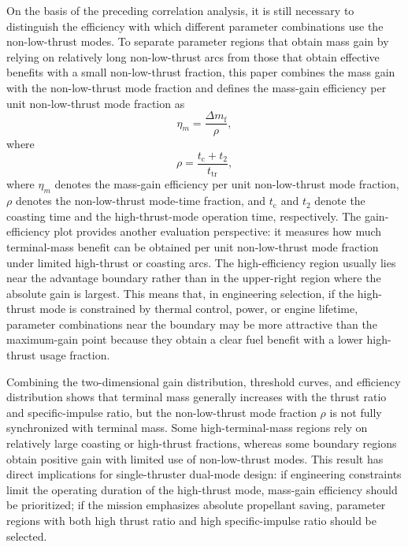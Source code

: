 ﻿\documentclass{IEEEtaes}
\begin{document}
On the basis of the preceding correlation analysis, it is still necessary to distinguish the efficiency with which different parameter combinations use the non-low-thrust modes. To separate parameter regions that obtain mass gain by relying on relatively long non-low-thrust arcs from those that obtain effective benefits with a small non-low-thrust fraction, this paper combines the mass gain with the non-low-thrust mode fraction and defines the mass-gain efficiency per unit non-low-thrust mode fraction as
\begin{equation}
\eta_m=\frac{\Delta m_{\mathrm{f}}}{\rho},
\end{equation}
where
\begin{equation}
\rho=\frac{t_{\mathrm{c}}+t_2}{t_{\mathrm{tr}}},
\end{equation}
where $\eta_m$ denotes the mass-gain efficiency per unit non-low-thrust mode fraction, $\rho$ denotes the non-low-thrust mode-time fraction, and $t_{\mathrm{c}}$ and $t_2$ denote the coasting time and the high-thrust-mode operation time, respectively. The gain-efficiency plot provides another evaluation perspective: it measures how much terminal-mass benefit can be obtained per unit non-low-thrust mode fraction under limited high-thrust or coasting arcs. The high-efficiency region usually lies near the advantage boundary rather than in the upper-right region where the absolute gain is largest. This means that, in engineering selection, if the high-thrust mode is constrained by thermal control, power, or engine lifetime, parameter combinations near the boundary may be more attractive than the maximum-gain point because they obtain a clear fuel benefit with a lower high-thrust usage fraction.

Combining the two-dimensional gain distribution, threshold curves, and efficiency distribution shows that terminal mass generally increases with the thrust ratio and specific-impulse ratio, but the non-low-thrust mode fraction $\rho$ is not fully synchronized with terminal mass. Some high-terminal-mass regions rely on relatively large coasting or high-thrust fractions, whereas some boundary regions obtain positive gain with limited use of non-low-thrust modes. This result has direct implications for single-thruster dual-mode design: if engineering constraints limit the operating duration of the high-thrust mode, mass-gain efficiency should be prioritized; if the mission emphasizes absolute propellant saving, parameter regions with both high thrust ratio and high specific-impulse ratio should be selected.
\end{document}
